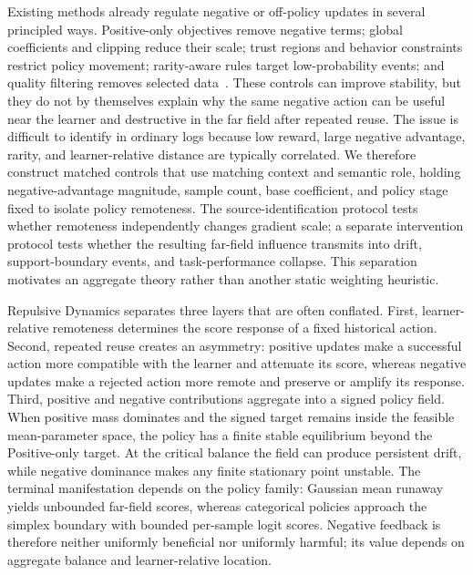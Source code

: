 Existing methods already regulate negative or off-policy updates in several principled ways. Positive-only objectives remove negative terms; global coefficients and clipping reduce their scale; trust regions and behavior constraints restrict policy movement; rarity-aware rules target low-probability events; and quality filtering removes selected data~\cite{schulman2017proximal,kumar2020conservative,kostrikov2021offline,peng2019advantage}. These controls can improve stability, but they do not by themselves explain why the same negative action can be useful near the learner and destructive in the far field after repeated reuse. The issue is difficult to identify in ordinary logs because low reward, large negative advantage, rarity, and learner-relative distance are typically correlated. We therefore construct matched controls that use matching context and semantic role, holding negative-advantage magnitude, sample count, base coefficient, and policy stage fixed to isolate policy remoteness. The source-identification protocol tests whether remoteness independently changes gradient scale; a separate intervention protocol tests whether the resulting far-field influence transmits into drift, support-boundary events, and task-performance collapse. This separation motivates an aggregate theory rather than another static weighting heuristic.

Repulsive Dynamics separates three layers that are often conflated. First, learner-relative remoteness determines the score response of a fixed historical action. Second, repeated reuse creates an asymmetry: positive updates make a successful action more compatible with the learner and attenuate its score, whereas negative updates make a rejected action more remote and preserve or amplify its response. Third, positive and negative contributions aggregate into a signed policy field. When positive mass dominates and the signed target remains inside the feasible mean-parameter space, the policy has a finite stable equilibrium beyond the Positive-only target. At the critical balance the field can produce persistent drift, while negative dominance makes any finite stationary point unstable. The terminal manifestation depends on the policy family: Gaussian mean runaway yields unbounded far-field scores, whereas categorical policies approach the simplex boundary with bounded per-sample logit scores. Negative feedback is therefore neither uniformly beneficial nor uniformly harmful; its value depends on aggregate balance and learner-relative location.

